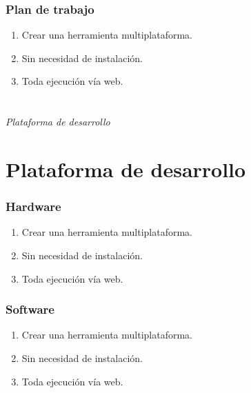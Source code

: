 \documentclass{beamer}
\begin{document}
\begin{frame}
	\frametitle{Plan de trabajo}
	\begin{enumerate}
		\item Crear una herramienta multiplataforma.
		\item Sin necesidad de instalación.
		\item Toda ejecución vía web.
	\end{enumerate}
\end{frame}


\section*{}
\begin{frame}{}
	\centering \Huge
	\emph{Plataforma de desarrollo}
\end{frame}

\section{Plataforma de desarrollo}
\begin{frame}
	\frametitle{Hardware}
	\begin{enumerate}
		\item Crear una herramienta multiplataforma.
		\item Sin necesidad de instalación.
		\item Toda ejecución vía web.
	\end{enumerate}
\end{frame}

\begin{frame}
	\frametitle{Software}
	\begin{enumerate}
		\item Crear una herramienta multiplataforma.
		\item Sin necesidad de instalación.
		\item Toda ejecución vía web.
	\end{enumerate}
\end{frame}


\end{document}
